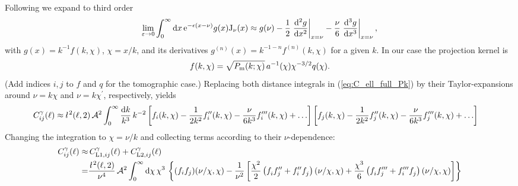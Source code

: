 \documentclass[fleqn,usenatbib]{mnras} %
\newcommand{\ellbar}{\hbox{\it \l}\,}
\newcommand{\pref}{{\cal A}}
\begin{document}
Following \cite{2008PhRvD..78l3506L} we expand to third order
%
\begin{equation}
  \lim_{\varepsilon \rightarrow 0} \int_0^\infty {\rm d} x \, {\rm e}^{-\epsilon (x - \nu)} g(x) {\rm J}_\nu(x)
  \approx g(\nu) - \frac 1 2 \left.\frac{{\rm d}^2 g}{{\rm d} x^2}\right|_{x=\nu}
                 - \frac \nu 6 \left.\frac{{\rm d}^3 g}{{\rm d} x^3}\right|_{x=\nu} ,
\end{equation}
%
with $g(x) = k^{-1} f(k, \chi)$, $\chi=x/k$, and its derivatives $g^{(n)}(x) =
k^{-1-n} f^{(n)}(k, \chi)$ for a given $k$. In our case the projection kernel is
%
\begin{equation}
  f(k, \chi) = \sqrt{P_{\rm m}(k; \chi)} \, a^{-1}(\chi) \chi^{-3/2} q(\chi).
  \label{eq:f_LA08}
\end{equation}
%
(Add indices $i, j$ to $f$ and $q$ for the tomographic case.)
%
Replacing both distance integrals in (\ref{eq:C_ell_full_Pk}) by their Taylor-expansions around $\nu = k \chi$ and $\nu = k \chi^\prime$,
respectively, yields
%
\begin{align}
  C^\gamma_{ij}(\ell) \approx & \, \ellbar^2(\ell, 2) \, \pref^2
    \int_0^\infty \frac{{\rm d} k}{k^3} \, k^{-2}
    \left[ f_i(k, \chi) - \frac{1}{2 k^2} f_i^{\prime\prime}(k, \chi)
      - \frac{\nu}{6 k^3} f_i^{\prime\prime\prime}(k, \chi) + \ldots \right]
    \left[ f_j(k, \chi) - \frac{1}{2 k^2} f_j^{\prime\prime}(k, \chi)
    - \frac{\nu}{6 k^3} f_j^{\prime\prime\prime}(k, \chi) + \ldots \right]
  \label{eq:C_ell_limber2_dk}
\end{align}
%
Changing the integration to $\chi = \nu/k$ and collecting terms according to their $\nu$-dependence:
%
\begin{align}
  C^\gamma_{ij}(\ell) \approx & \, C^\gamma_{{\rm L1}, ij}(\ell) + C^\gamma_{{\rm L2}, ij}(\ell)
      \nonumber \\
    = & \frac{\ellbar^2(\ell, 2)}{\nu^4} \, \pref^2
    \int_0^\infty {\rm d} \chi \, \chi^3 \, %
    \left\{
    (f_i f_j)(\nu/\chi, \chi)
     - \frac 1 {\nu^2} \left[ \frac{\chi^2}{2} \left( f^{}_i f^{\prime\prime}_j + f_i^{\prime\prime} f^{}_j \right)(\nu/\chi, \chi)
    + \frac{\chi^3}{6} \left( f^{}_i f^{\prime\prime\prime}_j + f^{\prime\prime\prime}_i f^{}_j \right)(\nu/\chi, \chi)
    \right]
    \right\}
  \label{eq:C_ell_limber12_dr}
\end{align}
\end{document}
